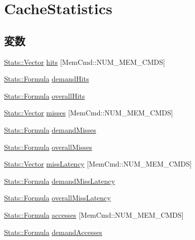 \hypertarget{group__CacheStatistics}{
\section{CacheStatistics}
\label{group__CacheStatistics}
}
\subsection*{変数}
\begin{DoxyCompactItemize}
\item 
\hyperlink{classStats_1_1Vector}{Stats::Vector} \hyperlink{group__CacheStatistics_gad6a8ff96d397437943d0a35012008e84}{hits} \mbox{[}MemCmd::NUM\_\-MEM\_\-CMDS\mbox{]}
\item 
\hyperlink{classStats_1_1Formula}{Stats::Formula} \hyperlink{group__CacheStatistics_gafc2d55cfff6a5b55a9c19bf5c7b13729}{demandHits}
\item 
\hyperlink{classStats_1_1Formula}{Stats::Formula} \hyperlink{group__CacheStatistics_gaa4d78014f29a4bc534e1d71a1ada3bb8}{overallHits}
\item 
\hyperlink{classStats_1_1Vector}{Stats::Vector} \hyperlink{group__CacheStatistics_gaef820137ee3e0d7ce5895019f76e1ad7}{misses} \mbox{[}MemCmd::NUM\_\-MEM\_\-CMDS\mbox{]}
\item 
\hyperlink{classStats_1_1Formula}{Stats::Formula} \hyperlink{group__CacheStatistics_gab0c200c0250a66f1e1d8a257d3f9f313}{demandMisses}
\item 
\hyperlink{classStats_1_1Formula}{Stats::Formula} \hyperlink{group__CacheStatistics_ga15889ae23e7332b01de9bc31e05a21e5}{overallMisses}
\item 
\hyperlink{classStats_1_1Vector}{Stats::Vector} \hyperlink{group__CacheStatistics_gaf96751c776ee651f3284e22686b8978a}{missLatency} \mbox{[}MemCmd::NUM\_\-MEM\_\-CMDS\mbox{]}
\item 
\hyperlink{classStats_1_1Formula}{Stats::Formula} \hyperlink{group__CacheStatistics_gaef1ab5073e901bd4df644ff0780fc668}{demandMissLatency}
\item 
\hyperlink{classStats_1_1Formula}{Stats::Formula} \hyperlink{group__CacheStatistics_ga7d70913fe3dbd532369b977f9a28446c}{overallMissLatency}
\item 
\hyperlink{classStats_1_1Formula}{Stats::Formula} \hyperlink{group__CacheStatistics_gaa45ed75982de310df369d8bfa4b8896f}{accesses} \mbox{[}MemCmd::NUM\_\-MEM\_\-CMDS\mbox{]}
\item 
\hyperlink{classStats_1_1Formula}{Stats::Formula} \hyperlink{group__CacheStatistics_gae4b2f837d0d9919fe4ce7389922a001d}{demandAccesses}

\end{DoxyCompactItemize}

